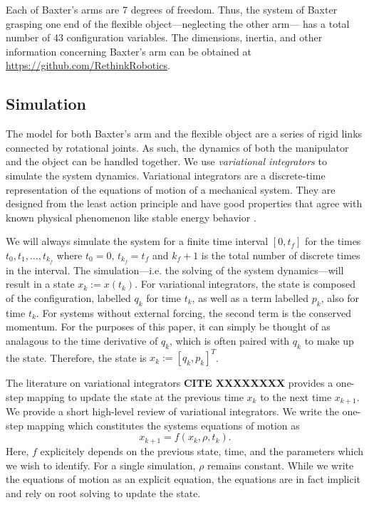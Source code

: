 \documentclass[runningheads,a4paper]{llncs}
\begin{document}
Each of Baxter's arms are 7 degrees of freedom. Thus, the system of Baxter grasping one end of the flexible object---neglecting the other arm--- has a total number of 43 configuration variables. The dimensions,  inertia, and other information concerning Baxter's arm can be obtained at \url{https://github.com/RethinkRobotics}.  

\subsection{Simulation}
The model for both Baxter's arm and the flexible object are a series of rigid links connected by rotational joints. As such, the dynamics of both the manipulator and the object can be handled together. We use \emph{variational integrators} to simulate the system dynamics.   Variational integrators are a discrete-time representation of the equations of motion of a mechanical system.  They are designed from the least action principle and have good properties that agree with known physical phenomenon like stable energy behavior \cite{pekarek_murphey}.  

We will always simulate the system for a finite time interval $[0,t_f]$ for the times $t_0,t_1,\ldots,t_{k_f}$ where $t_0 = 0$, $t_{k_f} = t_f$ and $k_f+1$ is the total number of discrete times in the interval. The simulation---i.e. the solving of the system dynamics---will result in a state $x_k:=x(t_k)$.  For variational integrators, the state is composed of the configuration, labelled $q_k$ for time $t_k$, as well as a term labelled $p_k$, also for time $t_k$. For systems without external forcing, the second term is the conserved momentum.  For the purposes of this paper, it can simply be thought of as analagous to the time derivative of $q_k$, which is often paired with $q_k$ to make up the state.  Therefore, the state is $x_k:=[q_k,p_k]^T$. 

The literature on variational integrators \textbf{CITE XXXXXXXX} provides a one-step mapping to update the state at the previous time $x_k$ to the next time $x_{k+1}$.  We provide a short high-level review of variational integrators.  We write the one-step mapping which constitutes the systems equations of motion as 
\begin{equation}
x_{k+1} = f(x_k,\rho,t_k).
\label{eq-fk}
\end{equation}
Here, $f$ explicitely depends on the previous state, time, and the parameters which we wish to identify. For a single simulation, $\rho$ remains constant.  While we write the equations of motion as an explicit equation, the equations are in fact implicit and rely on root solving to update the state. 
\end{document}
